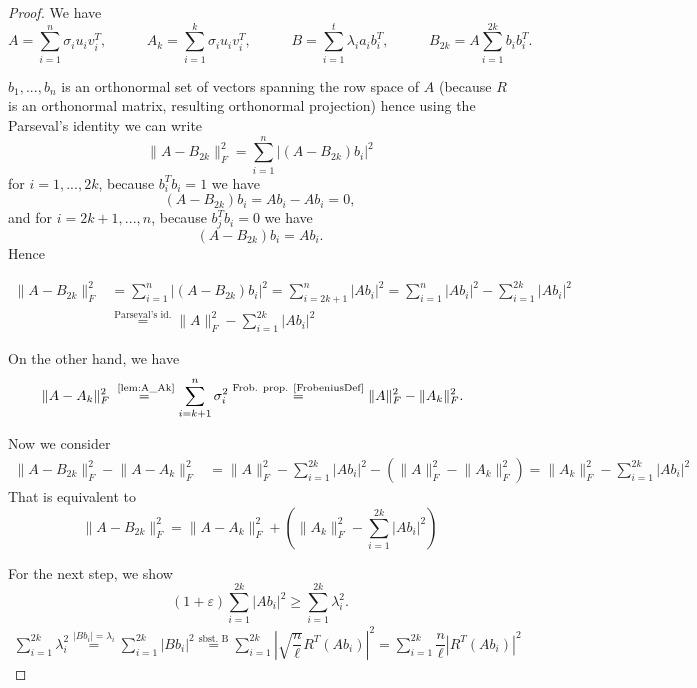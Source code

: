 \documentclass[a4paper,11pt,DIV=15]{scrartcl} %
\renewcommand{\epsilon}{\varepsilon}
\theoremstyle{plain}
\theoremstyle{definition}
\begin{document}
\begin{proof}
We have 
\[
A = \sum_{i=1}^n \sigma_i u_i v_i^T, \,\,\,\,\,\,\,\,\,\,\,\,\,\,\,\,\,A_k = \sum_{i=1}^k \sigma_i u_i v_i^T,  \,\,\,\,\,\,\,\,\,\,\,\,\,\,\,\,\, B=\sum_{i=1}^t \lambda_i a_i b_i^T,\,\,\,\,\,\,\,\,\,\,\,\,\,\,\,\,\, B_{2k} = A \sum_{i=1}^{2k} b_ib_i^T.
\]


$b_1,...,b_n$ is an orthonormal set of vectors spanning the row space of $A$ (because $R$ is an orthonormal matrix, resulting orthonormal projection) hence using the Parseval's identity we can write
\[
 \lVert A - B_{2k} \rVert_F^2 = \sum_{i=1}^n |(A - B_{2k})b_i|^2
\]
for $i = 1,...,2k$, because $b_i^Tb_i = 1$ we have
\[
(A - B_{2k})b_i = Ab_i - Ab_i = 0,
\]
and for  $i = 2k+1,...,n$, because $b_j^Tb_i = 0$ we have
\[
(A - B_{2k})b_i = Ab_i.
\]
Hence

\begin{align*}
    \lVert A - B_{2k} \rVert_F^2 &= \sum_{i=1}^n |(A - B_{2k})b_i|^2 = \sum_{i=2k+1}^n |A b_i|^2 = \sum_{i=1}^n |A b_i|^2 - \sum_{i=1}^{2k} |A b_i|^2\\
    &\overset{\text{Parseval's id.}}{=} \lVert A \rVert_F^2 - \sum_{i=1}^{2k} |A b_i|^2 
\end{align*}

On the other hand, we have
\begin{align*}
 \lVert A - A_k \rVert_F^2 &\overset{\text{ \cref{lem:A_Ak}}}{=} \sum_{i=k+1}^n \sigma_i^2  \overset{\text{Frob. prop. \cite{FrobeniusDef}}}{=}  \lVert A \rVert_F^2 - \lVert A_k \rVert_F^2. 
\end{align*}

Now we consider 
\begin{align*}
   \lVert A - B_{2k} \rVert_F^2 - \lVert A - A_k \rVert_F^2 &= \lVert A \rVert_F^2 - \sum_{i=1}^{2k} |A b_i|^2  - (\lVert A \rVert_F^2 - \lVert A_k \rVert_F^2) = \lVert A_k \rVert_F^2 - \sum_{i=1}^{2k} |A b_i|^2
\end{align*}
That is equivalent to
\begin{equation}
   \lVert A - B_{2k} \rVert_F^2 = \lVert A - A_k \rVert_F^2 + (\lVert A_k \rVert_F^2 - \sum_{i=1}^{2k} |A b_i|^2)  \label{eq:A} 
\end{equation}



For the next step, we show
\[
(1+\epsilon) \sum_{i=1}^{2k} |A b_i|^2 \geq \sum_{i=1}^{2k} \lambda_i^2.
\]
\begin{align*}
    \sum_{i=1}^{2k} \lambda_i^2 \overset{|Bb_i| = \lambda_i}{=}\sum_{i=1}^{2k}|Bb_i|^2 
    \overset{\text{sbst. B}}{=} \sum_{i=1}^{2k} | \sqrt{\dfrac{n}{\ell}} R^T (Ab_i)|^2
    = \sum_{i=1}^{2k} \dfrac{n}{\ell}| R^T (Ab_i)|^2
\end{align*}


\end{proof}
\end{document}
